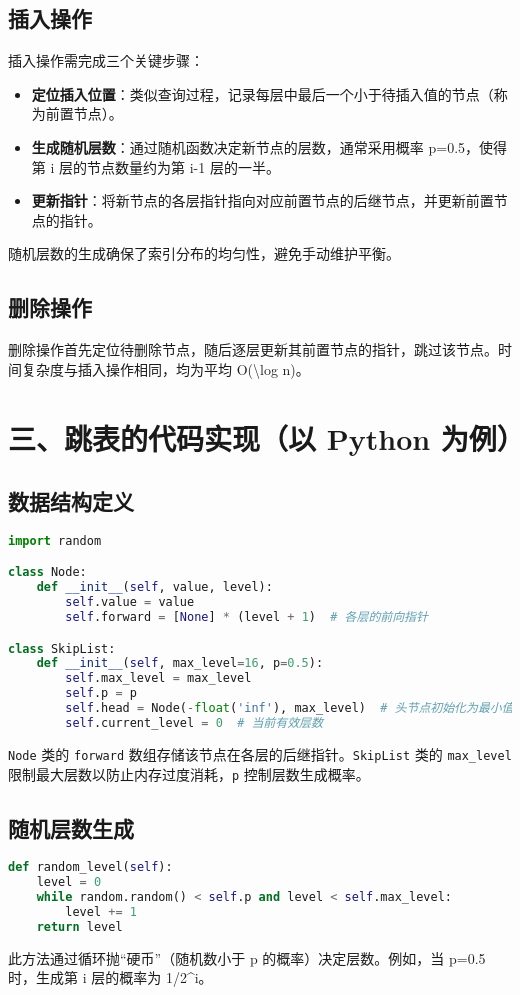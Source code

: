 \section{插入操作}
插入操作需完成三个关键步骤：\par
\begin{itemize}
\item \textbf{定位插入位置}：类似查询过程，记录每层中最后一个小于待插入值的节点（称为前置节点）。
\item \textbf{生成随机层数}：通过随机函数决定新节点的层数，通常采用概率 p=0.5，使得第 i 层的节点数量约为第 i-1 层的一半。
\item \textbf{更新指针}：将新节点的各层指针指向对应前置节点的后继节点，并更新前置节点的指针。
\end{itemize}
随机层数的生成确保了索引分布的均匀性，避免手动维护平衡。\par
\section{删除操作}
删除操作首先定位待删除节点，随后逐层更新其前置节点的指针，跳过该节点。时间复杂度与插入操作相同，均为平均 O(\textbackslash{}log n)。\par
\chapter{三、跳表的代码实现（以 Python 为例）}
\section{数据结构定义}
\begin{lstlisting}[language=python]
import random  

class Node:  
    def __init__(self, value, level):  
        self.value = value  
        self.forward = [None] * (level + 1)  # 各层的前向指针  

class SkipList:  
    def __init__(self, max_level=16, p=0.5):  
        self.max_level = max_level  
        self.p = p  
        self.head = Node(-float('inf'), max_level)  # 头节点初始化为最小值  
        self.current_level = 0  # 当前有效层数  
\end{lstlisting}
\verb!Node! 类的 \verb!forward! 数组存储该节点在各层的后继指针。\verb!SkipList! 类的 \verb!max_level! 限制最大层数以防止内存过度消耗，\verb!p! 控制层数生成概率。\par
\section{随机层数生成}
\begin{lstlisting}[language=python]
def random_level(self):  
    level = 0  
    while random.random() < self.p and level < self.max_level:  
        level += 1  
    return level  
\end{lstlisting}
此方法通过循环抛“硬币”（随机数小于 p 的概率）决定层数。例如，当 p=0.5 时，生成第 i 层的概率为 1/2\^{}i。\par
